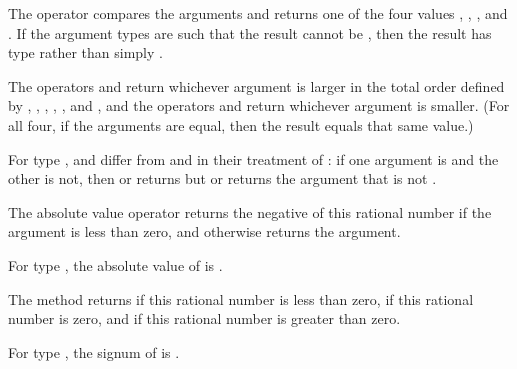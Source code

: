 The  operator compares the arguments and returns one of the four values
, , , and .
If the argument types are such that the result cannot be ,
then the result has type  rather than simply .



The operators  and  return whichever argument is larger
in the total order defined by \EXP{<}, \EXP{\leq}, \EXP{=}, \EXP{\geq}, \EXP{>}, and ,
and the operators  and  return whichever argument is smaller.
(For all four, if the arguments are equal, then the result equals that same value.)

For type ,  and  differ from
 and  in their treatment of :
if one argument is  and the other is not, then  or  returns  but
 or  returns the argument that is not .



The absolute value operator \EXP{\left|\ldots\right|} returns the negative of this rational number
if the argument is less than zero, and otherwise returns the argument.

For type , the absolute value of  is .



The method  returns  if this rational number is less than zero,
 if this rational number is zero, and  if this rational number is greater than zero.

For type , the signum of  is .


